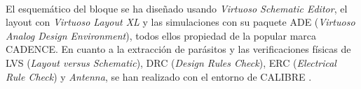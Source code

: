 \paragraph{}
El esquemático del bloque se ha diseñado usando \textit{Virtuoso Schematic Editor}\cite{VirtuosoSchematic},
el layout con \textit{Virtuoso Layout XL}\cite{VirtuosoLayoutXL} y las
simulaciones con su paquete ADE (\textit{Virtuoso Analog Design Environment}), todos
ellos propiedad de la popular marca CADENCE\textsuperscript{\textregistered}.
En cuanto a la extracción de parásitos y las verificaciones físicas de LVS
(\textit{Layout versus Schematic}), DRC (\textit{Design Rules Check}), ERC
(\textit{Electrical Rule Check}) y \textit{Antenna}, se han realizado con el entorno
de CALIBRE\textsuperscript{\textregistered} \cite{Calibre}.
